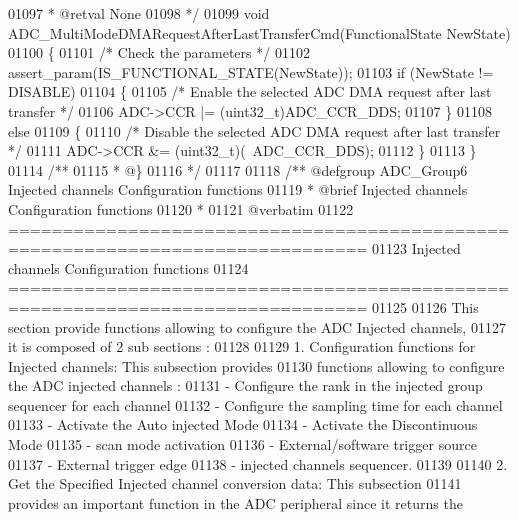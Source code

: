 \begin{DoxyCode}
01097 \textcolor{comment}{  * @retval None}
01098 \textcolor{comment}{  */}
01099 \textcolor{keywordtype}{void} ADC_MultiModeDMARequestAfterLastTransferCmd(FunctionalState NewState)
01100 \{
01101   \textcolor{comment}{/* Check the parameters */}
01102   assert_param(IS\_FUNCTIONAL\_STATE(NewState));
01103   \textcolor{keywordflow}{if} (NewState != DISABLE)
01104   \{
01105     \textcolor{comment}{/* Enable the selected ADC DMA request after last transfer */}
01106     ADC->CCR |= (uint32\_t)ADC_CCR_DDS;
01107   \}
01108   \textcolor{keywordflow}{else}
01109   \{
01110     \textcolor{comment}{/* Disable the selected ADC DMA request after last transfer */}
01111     ADC->CCR &= (uint32\_t)(~ADC_CCR_DDS);
01112   \}
01113 \}
01114 \textcolor{comment}{/**}
01115 \textcolor{comment}{  * @\}}
01116 \textcolor{comment}{  */}
01117 
01118 \textcolor{comment}{/** @defgroup ADC\_Group6 Injected channels Configuration functions}
01119 \textcolor{comment}{ *  @brief   Injected channels Configuration functions }
01120 \textcolor{comment}{ *}
01121 \textcolor{comment}{@verbatim   }
01122 \textcolor{comment}{ ===============================================================================}
01123 \textcolor{comment}{                     Injected channels Configuration functions}
01124 \textcolor{comment}{ ===============================================================================  }
01125 \textcolor{comment}{}
01126 \textcolor{comment}{  This section provide functions allowing to configure the ADC Injected channels,}
01127 \textcolor{comment}{  it is composed of 2 sub sections : }
01128 \textcolor{comment}{    }
01129 \textcolor{comment}{  1. Configuration functions for Injected channels: This subsection provides }
01130 \textcolor{comment}{     functions allowing to configure the ADC injected channels :    }
01131 \textcolor{comment}{    - Configure the rank in the injected group sequencer for each channel}
01132 \textcolor{comment}{    - Configure the sampling time for each channel    }
01133 \textcolor{comment}{    - Activate the Auto injected Mode  }
01134 \textcolor{comment}{    - Activate the Discontinuous Mode }
01135 \textcolor{comment}{    - scan mode activation  }
01136 \textcolor{comment}{    - External/software trigger source   }
01137 \textcolor{comment}{    - External trigger edge }
01138 \textcolor{comment}{    - injected channels sequencer.}
01139 \textcolor{comment}{    }
01140 \textcolor{comment}{   2. Get the Specified Injected channel conversion data: This subsection }
01141 \textcolor{comment}{      provides an important function in the ADC peripheral since it returns the }

\end{DoxyCode}
